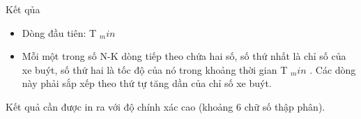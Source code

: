 Kết qủa
\begin{itemize}
	\item     Dòng đầu tiên: T    $_     min    $
	\item     Mỗi một trong số N-K dòng tiếp theo chứa hai số, số thứ nhất là chỉ số của xe buýt, số thứ hai là tốc độ của nó trong khoảng thời gian   T    $_     min    $    . Các dòng này phải sắp xếp theo thứ tự tăng dần của chỉ số xe buýt.   
\end{itemize}

   Kết quả cần được in ra với độ chính xác cao (khoảng 6 chữ số thập phân).